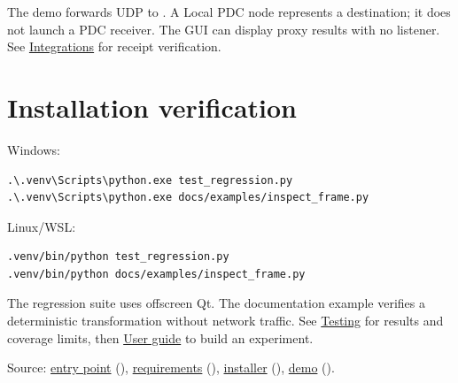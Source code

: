 The demo forwards UDP to . A Local PDC node represents a destination; it does not launch a PDC receiver. The GUI can display proxy results with no listener. See \hyperref[chapter-9]{Integrations} for receipt verification.

\section*{Installation verification}
\par\noindent\begin{minipage}{\linewidth}
Windows:
\begin{lstlisting}[title={POWERSHELL}]
.\.venv\Scripts\python.exe test_regression.py
.\.venv\Scripts\python.exe docs/examples/inspect_frame.py
\end{lstlisting}
\end{minipage}\par
\par\noindent\begin{minipage}{\linewidth}
Linux/WSL:
\begin{lstlisting}[title={BASH}]
.venv/bin/python test_regression.py
.venv/bin/python docs/examples/inspect_frame.py
\end{lstlisting}
\end{minipage}\par
\par\noindent\begin{minipage}{\linewidth}\setlength{\parskip}{5pt}
The regression suite uses offscreen Qt. The documentation example verifies a deterministic transformation without network traffic. See \hyperref[chapter-15]{Testing} for results and coverage limits, then \hyperref[chapter-3]{User guide} to build an experiment.
{\footnotesize\color{muted}\raggedright Source: \href{https://github.com/neerajjayesh/GridSec-project/blob/main/main.py}{entry point} (), \href{https://github.com/neerajjayesh/GridSec-project/blob/main/requirements.txt}{requirements} (), \href{https://github.com/neerajjayesh/GridSec-project/blob/main/install.sh}{installer} (), \href{https://github.com/neerajjayesh/GridSec-project/blob/main/mitm-demo-topology.json}{demo} ().\par}
\end{minipage}\par

